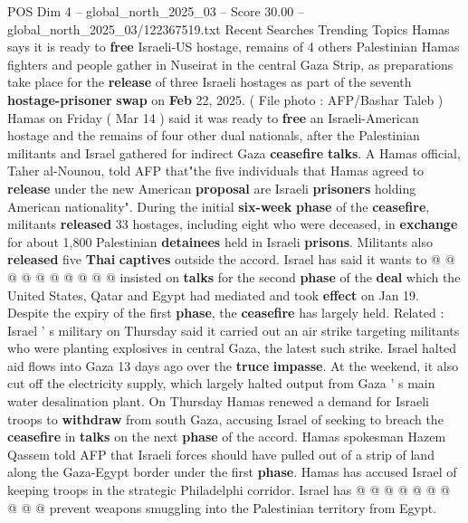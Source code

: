 \begin{textsample}{POS Dim 4 – global\_north\_2025\_03 – Score 30.00 – global\_north\_2025\_03/122367519.txt}  \label{ex:f4_pos_070}
Recent Searches Trending Topics Hamas says it is ready to \textbf{free} Israeli-US hostage, remains of 4 others Palestinian Hamas fighters and people gather in Nuseirat in the central Gaza Strip, as preparations take place for the \textbf{release} of three Israeli hostages as part of the seventh \textbf{hostage-prisoner} \textbf{swap} on \textbf{Feb} 22, 2025. ( File photo : AFP/Bashar Taleb ) Hamas on Friday ( Mar 14 ) said it was ready to \textbf{free} an Israeli-American hostage and the remains of four other dual nationals, after the Palestinian militants and Israel gathered for indirect Gaza \textbf{ceasefire} \textbf{talks}.
A Hamas official, Taher al-Nounou, told AFP that"the five individuals that Hamas agreed to \textbf{release} under the new American \textbf{proposal} are Israeli \textbf{prisoners} holding American nationality".
During the initial \textbf{six-week} \textbf{phase} of the \textbf{ceasefire}, militants \textbf{released} 33 hostages, including eight who were deceased, in \textbf{exchange} for about 1,800 Palestinian \textbf{detainees} held in Israeli \textbf{prisons}.
Militants also \textbf{released} five \textbf{Thai} \textbf{captives} outside the accord.
Israel has said it wants to @ @ @ @ @ @ @ @ @ @ insisted on \textbf{talks} for the second \textbf{phase} of the \textbf{deal} which the United States, Qatar and Egypt had mediated and took \textbf{effect} on Jan 19.
Despite the expiry of the first \textbf{phase}, the \textbf{ceasefire} has largely held.
Related : Israel ' s military on Thursday said it carried out an air strike targeting militants who were planting explosives in central Gaza, the latest such strike.
Israel halted aid flows into Gaza 13 days ago over the \textbf{truce} \textbf{impasse}.
At the weekend, it also cut off the electricity supply, which largely halted output from Gaza ' s main water desalination plant.
On Thursday Hamas renewed a demand for Israeli troops to \textbf{withdraw} from south Gaza, accusing Israel of seeking to breach the \textbf{ceasefire} in \textbf{talks} on the next \textbf{phase} of the accord.
Hamas spokesman Hazem Qassem told AFP that Israeli forces should have pulled out of a strip of land along the Gaza-Egypt border under the first \textbf{phase}.
Hamas has accused Israel of keeping troops in the strategic Philadelphi corridor.
Israel has @ @ @ @ @ @ @ @ @ @ prevent weapons smuggling into the Palestinian territory from Egypt.

\end{textsample}
